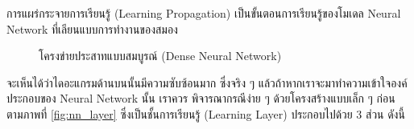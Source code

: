 การแผร่กระจายการเรียนรู้ (Learning Propagation) เป็นขั้นตอนการเรียนรู้ของโมเดล Neural Network ที่เลียนแบบการทำงานของสมอง 

\begin{figure}[H]
\begin{center}
    \caption{โครงข่ายประสาทแบบสมบูรณ์ (Dense Neural Network)}
\end{center}
\end{figure}

จะเห็นได้ว่าไดอะแกรมด้านบนนั้นมีความซับซ้อนมาก ซึ่งจริง ๆ แล้วถ้าหากเราจะมาทำความเข้าใจองค์ประกอบของ Neural Network นั้น เราควร%
พิจารณากรณีง่าย ๆ ด้วยโครงสร้างแบบเล็ก ๆ ก่อน ตามภาพที่ \ref{fig:nn_layer} ซึ่งเป็นชั้นการเรียนรู้ (Learning Layer) ประกอบไปด้วย
3 ส่วน ดังนี้

